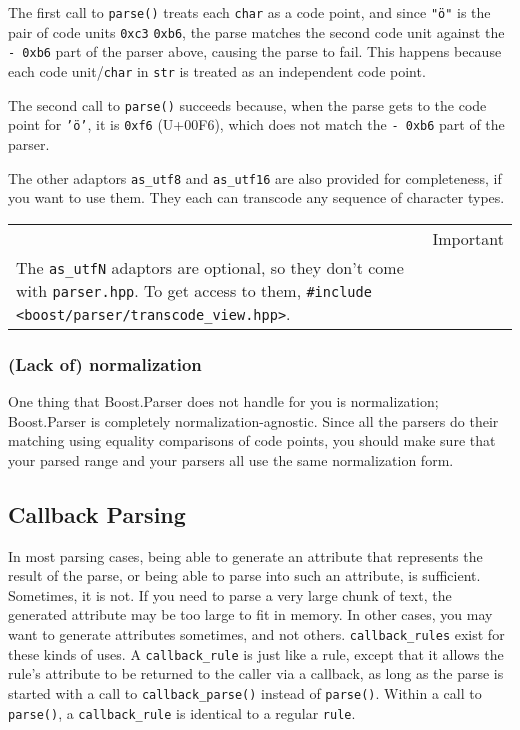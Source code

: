 The first call to \texttt{parse()} treats each \texttt{char} as a code point, and since \texttt{"ö"} is the pair of code units \texttt{0xc3} \texttt{0xb6}, the parse matches the second code unit against the \texttt{- 0xb6} part of the parser above, causing the parse to fail. This happens because each code unit/\texttt{char} in \texttt{str} is treated as an independent code point.

The second call to \texttt{parse()} succeeds because, when the parse gets to the code point for \texttt{'ö'}, it is \texttt{0xf6} (U+00F6), which does not match the \texttt{- 0xb6} part of the parser.

The other adaptors \texttt{as\_utf8} and \texttt{as\_utf16} are also provided for completeness, if you want to use them. They each can transcode any sequence of character types.

\begin{longtable}[]{@{}
  >{\raggedright\arraybackslash}p{}
  >{\raggedright\arraybackslash}p{}@{}}
\toprule\noalign{}
\endhead
\bottomrule\noalign{}
\endlastfoot
\begin{minipage}[t]{\linewidth}\raggedright
\end{minipage} & Important \\
The \texttt{as\_utfN} adaptors are optional, so they don't come with \texttt{parser.hpp}. To get access to them, \texttt{\#include <boost/parser/transcode\_view.hpp>}. & \\
\end{longtable}

\subsubsection{(Lack of) normalization}

One thing that Boost.Parser does not handle for you is normalization; Boost.Parser is completely normalization-agnostic. Since all the parsers do their matching using equality comparisons of code points, you should make sure that your parsed range and your parsers all use the same normalization form.

\subsection{Callback Parsing}

In most parsing cases, being able to generate an attribute that represents the result of the parse, or being able to parse into such an attribute, is sufficient. Sometimes, it is not. If you need to parse a very large chunk of text, the generated attribute may be too large to fit in memory. In other cases, you may want to generate attributes sometimes, and not others. \texttt{callback\_rules} exist for these kinds of uses. A \texttt{callback\_rule} is just like a rule, except that it allows the rule's attribute to be returned to the caller via a callback, as long as the parse is started with a call to \texttt{callback\_parse()} instead of \texttt{parse()}. Within a call to \texttt{parse()}, a \texttt{callback\_rule} is identical to a regular \texttt{rule}.

